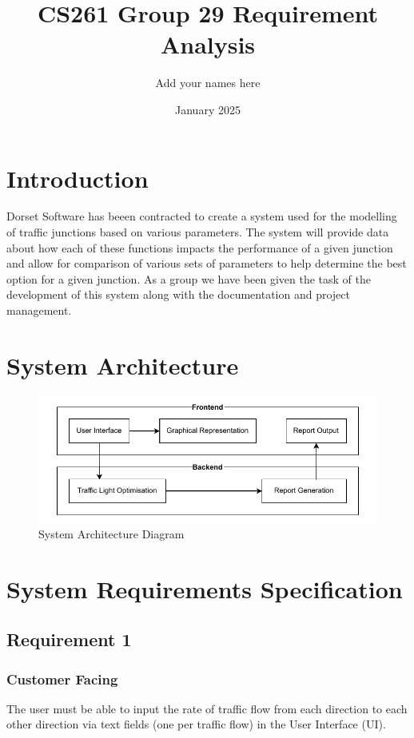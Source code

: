 \documentclass{article}
\title{CS261 Group 29 Requirement Analysis}
\author{Add your names here}
\date{January 2025}
\begin{document}
\maketitle


\section{Introduction}
Dorset Software has beeen contracted to create a system used for the modelling 
of traffic junctions based on various parameters. The system will provide 
data about how each of these functions impacts the performance of a given 
junction and allow for comparison of various sets of parameters to help 
determine the best option for a given junction. As a group we have been given 
the task of the development of this system along with the documentation and 
project management.

\section{System Architecture}
\begin{figure}[H]
    \centering
    \includegraphics[width=0.5\linewidth]{System architecture.drawio.pdf}
    \caption{System Architecture Diagram}
    \label{system architecture}
\end{figure}

\section{System Requirements Specification}
\subsection{Requirement 1}
\subsubsection{Customer Facing}
The user must be able to input the rate of traffic flow from 
each direction to each other direction via text fields (one per traffic flow) 
in the User Interface (UI).
\end{document}
